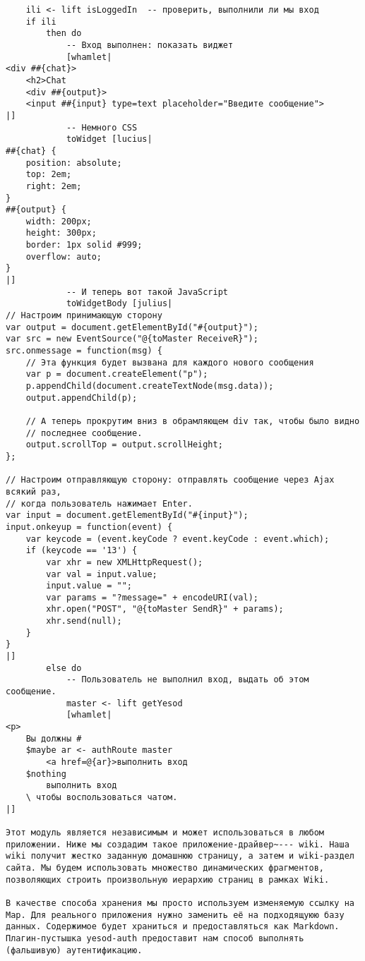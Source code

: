 \begin{lstlisting}
    ili <- lift isLoggedIn  -- проверить, выполнили ли мы вход
    if ili
        then do
            -- Вход выполнен: показать виджет
            [whamlet|
<div ##{chat}>
    <h2>Chat
    <div ##{output}>
    <input ##{input} type=text placeholder="Введите сообщение">
|]
            -- Немного CSS
            toWidget [lucius|
##{chat} {
    position: absolute;
    top: 2em;
    right: 2em;
}
##{output} {
    width: 200px;
    height: 300px;
    border: 1px solid #999;
    overflow: auto;
}
|]
            -- И теперь вот такой JavaScript
            toWidgetBody [julius|
// Настроим принимающую сторону
var output = document.getElementById("#{output}");
var src = new EventSource("@{toMaster ReceiveR}");
src.onmessage = function(msg) {
    // Эта функция будет вызвана для каждого нового сообщения
    var p = document.createElement("p");
    p.appendChild(document.createTextNode(msg.data));
    output.appendChild(p);

    // А теперь прокрутим вниз в обрамляющем div так, чтобы было видно
    // последнее сообщение.
    output.scrollTop = output.scrollHeight;
};

// Настроим отправляющую сторону: отправлять сообщение через Ajax всякий раз,
// когда пользователь нажимает Enter.
var input = document.getElementById("#{input}");
input.onkeyup = function(event) {
    var keycode = (event.keyCode ? event.keyCode : event.which);
    if (keycode == '13') {
        var xhr = new XMLHttpRequest();
        var val = input.value;
        input.value = "";
        var params = "?message=" + encodeURI(val);
        xhr.open("POST", "@{toMaster SendR}" + params);
        xhr.send(null);
    }
}
|]
        else do
            -- Пользователь не выполнил вход, выдать об этом сообщение.
            master <- lift getYesod
            [whamlet|
<p>
    Вы должны #
    $maybe ar <- authRoute master
        <a href=@{ar}>выполнить вход
    $nothing
        выполнить вход
    \ чтобы воспользоваться чатом.
|]

Этот модуль является независимым и может использоваться в любом приложении. Ниже мы создадим такое приложение-драйвер~--- wiki. Наша wiki получит жестко заданную домашнюю страницу, а затем и wiki-раздел сайта. Мы будем использовать множество динамических фрагментов, позволяющих строить произвольную иерархию страниц в рамках Wiki.

В качестве способа хранения мы просто используем изменяемую ссылку на Map. Для реального приложения нужно заменить её на подходящуюю базу данных. Содержимое будет храниться и предоставляться как Markdown. Плагин-пустышка yesod-auth предоставит нам способ выполнять (фальшивую) аутентификацию.


\end{lstlisting}
